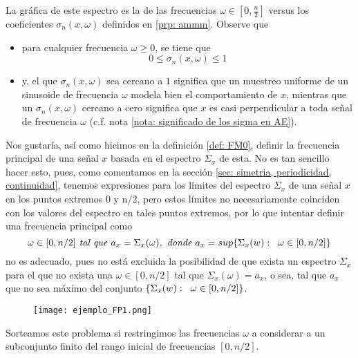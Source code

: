\begin{itemize}
	La gráfica de este espectro es la de 
	las frecuencias $\omega \in [0, \frac{n}{2}]$ versus	
	los coeficientes
	$\sigma_{n}(x, \omega)$ definidos en 
	\ref{prp: ammm}. Observe que
	\begin{itemize}
		\item para cualquier frecuencia $\omega \geq 0$, se tiene que
		\[
		0 \leq \sigma_{n}(x, \omega) \leq 1
		\]
		\item 
	y, el que
	$\sigma_{n}(x, \omega)$ sea cercano a $1$ significa que un
	muestreo uniforme de un sinusoide de frecuencia $\omega$
	modela bien el comportamiento de $x$,
	mientras que un $\sigma_{n}(x, \omega)$ cercano
	a cero significa que 
	$x$ es casi perpendicular a toda señal de frecuencia $\omega$
	(c.f. nota \ref{nota: significado de los sigma en AE}).
	\end{itemize}
\end{itemize}

Nos gustaría, así como hicimos en la definición
\ref{def: FM0}, definir la frecuencia principal 
de una señal $x$ basada en el espectro
$\Sigma_{x}$ de esta. No es tan sencillo hacer esto, pues,
como comentamos en la sección
\ref{sec: simetria, periodicidad, continuidad}, 
tenemos expresiones para los límites del 
espectro $\Sigma_{x}$ de una señal $x$
en los puntos extremos $0$ y n/2,
pero estos límites no necesariamente coinciden con los
valores del espectro en tales puntos extremos,
por lo que intentar definir una
frecuencia principal como
\[
\omega \in [0, n/2] \textit{ tal que }
a_{x} = \Sigma_{x}(\omega), \textit{ donde }
a_{x} = sup \{ \Sigma_{x}(w): \hspace{0.2cm} \omega
\in [0, n/2] \}
\]
no es adecuado, pues no está excluida la 
posibilidad de que exista un espectro $\Sigma_{x}$
para el que no exista una $\omega \in [0, n/2]$ 
tal que $\Sigma_{x}(\omega) = a_{x}$, o sea, tal que 
$a_{x}$ que no sea máximo
del conjunto 
$\{ \Sigma_{x}(w): \hspace{0.2cm} \omega
\in [0, n/2] \}$. \\

\begin{figure}[H]
	\centering
	\texttt{[image: ejemplo\_FP1.png]} 
\end{figure}	
Sorteamos este problema si restringimos las frecuencias
$\omega$ a considerar a un subconjunto finito del
rango inicial de frecuencias
$[0, n/2]$.

